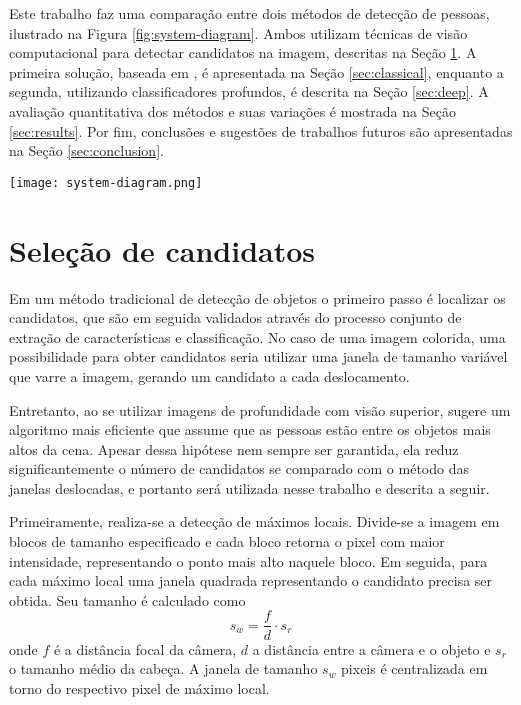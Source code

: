   Este trabalho faz uma comparação entre dois métodos de detecção de pessoas, ilustrado na Figura \ref{fig:system-diagram}. Ambos utilizam técnicas de visão computacional para detectar candidatos na imagem, descritas na Seção \ref{sec:candidates}. A primeira solução, baseada em \cite{rauter}, é apresentada na Seção \ref{sec:classical}, enquanto a segunda, utilizando classificadores profundos, é descrita na Seção \ref{sec:deep}. A avaliação quantitativa dos métodos e suas variações é mostrada na Seção \ref{sec:results}. Por fim, conclusões e sugestões de trabalhos futuros são apresentadas na Seção \ref{sec:conclusion}.

  \begin{figure*}[!t]
  \centering
  \texttt{[image: system-diagram.png]}
  \caption{Diagrama do sistema de detecção de pessoas.}
  \label{fig:system-diagram}
  \end{figure*}

\section{Seleção de candidatos}
\label{sec:candidates}

    Em um método tradicional de detecção de objetos \cite{traditional-objdetect} o primeiro passo é localizar os candidatos, que são em seguida validados através do processo conjunto de extração de características e classificação. No caso de uma imagem colorida, uma possibilidade para obter candidatos seria utilizar uma janela de tamanho variável que varre a imagem, gerando um candidato a cada deslocamento.

    Entretanto, ao se utilizar imagens de profundidade com visão superior, \cite{rauter} sugere um algoritmo mais eficiente que assume que as pessoas estão entre os objetos mais altos da cena. Apesar dessa hipótese nem sempre ser garantida, ela reduz significantemente o número de candidatos se comparado com o método das janelas deslocadas, e portanto será utilizada nesse trabalho e descrita a seguir.

    Primeiramente, realiza-se a detecção de máximos locais. Divide-se a imagem em blocos de tamanho especificado e cada bloco retorna o pixel com maior intensidade, representando o ponto mais alto naquele bloco. Em seguida, para cada máximo local uma janela quadrada representando o candidato precisa ser obtida. Seu tamanho é calculado como
    \begin{equation}
      s_w = \frac{f}{d} \cdot s_r
    \end{equation}
    onde $f$ é a distância focal da câmera, $d$ a distância entre a câmera e o objeto e $s_r$ o tamanho médio da cabeça. A janela de tamanho $s_w$ pixeis é centralizada em torno do respectivo pixel de máximo local.

